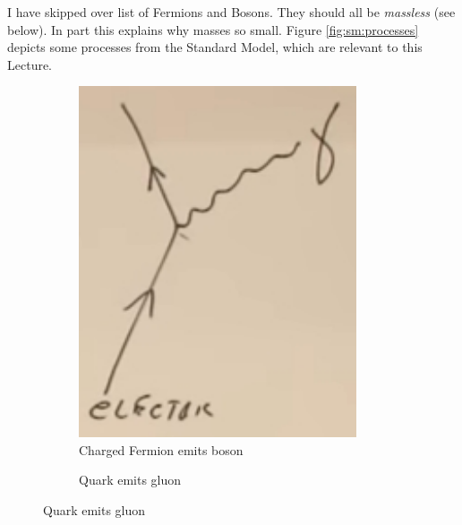 \documentclass[]{article}
\begin{document}
\begin{appendices}
	I have skipped over list of Fermions and Bosons. They should all be \emph{massless} (see below). In part this explains why masses so small. Figure \ref{fig:sm:processes} depicts some processes from the Standard Model, which are relevant to this Lecture.
	
	\begin{figure}[H]
		\caption{Processes of the Standard Model (not exhaustive)}\label{fig:sm:processes}
		\begin{subfigure}[t]{0.3\textwidth}
			\caption{Charged Fermion emits boson}
			\includegraphics[width=0.9\textwidth]{2-a2-feynman1}
		\end{subfigure}
		\begin{subfigure}[t]{0.3\textwidth}
			\caption{Quark emits gluon}

\end{subfigure}
\end{figure}
\end{appendices}
\end{document}
